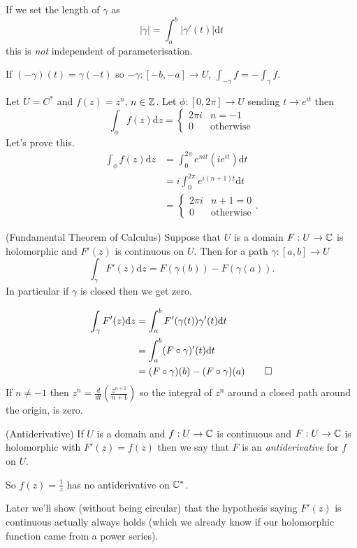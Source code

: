 \documentclass{article}
\begin{document}
\begin{remark}
  If we set the length of $ \gamma $ as
  \[
    |\gamma| = \int_a^b |\gamma'(t)|\mathrm dt
  \]
  this is \textit{not} independent of parameterisation.
\end{remark}
If $ (-\gamma)(t) = \gamma(-t) $ so $ -\gamma: [-b,-a]\to U $, $ \int_{-\gamma} f = -\int_\gamma f $.
\par
Let $ U=C^* $ and $ f(z) = z^n $, $ n\in \mathbb{Z} $. Let $ \phi:[0,2\pi]\to U $ sending $ t\to e^{it} $ then
\[
  \int_\phi f(z)\mathrm dz = \begin{cases}
     2\pi i & n = -1 \\
     0 & \text{otherwise}
  \end{cases}
\]
Let's prove this.
\begin{align*}
	\int_\phi f(z)\mathrm dz &= \int_0^{2\pi} e^{nit}(ie^{it})\mathrm dt \\
				 &= i\int_0^{2\pi} e^{i(n+1)t} \mathrm dt\\
				 &= \begin{cases}
					 2\pi i & n+1 = 0\\
					 0 & \text{otherwise}
				 \end{cases}.
\end{align*}
\begin{theorem}
	(Fundamental Theorem of Calculus) Suppose that $ U $ is a domain $ F:U\to \mathbb{C} $ is holomorphic and $ F'(z) $ is continuous on $ U $. Then for a path $ \gamma:[a,b]\to U $
	\[
	  \int_\gamma F'(z)\mathrm dz = F(\gamma(b)) - F(\gamma(a)).
	\]
	In particular if $ \gamma $ is closed then we get zero.
\end{theorem}
\pf 
\begin{align*}
	\int_\gamma F'(z)\mathrm dz &= \int_a^b F'(\gamma(t))\gamma'(t)\mathrm dt \\
				    &= \int_a^b (F\circ \gamma)'(t)\mathrm dt\\
				    &= (F\circ \gamma)(b) - (F\circ\gamma)(a)\qed
\end{align*}
If $ n\ne -1 $ then $ z^n =\frac {d}{dt}\left(\frac{z^{n+1}}{n+1}\right) $ so the integral of $ z^n $ around a closed path around the origin, is zero.
\begin{definition}
	(Antiderivative) If $ U $ is a domain and $ f:U\to \mathbb{C} $ is continuous and $ F:U\to \mathbb{C} $ is holomorphic with $ F'(z)=f(z) $ then we say that $ F $ is an \textit{antiderivative} for $ f $ on $ U $.
\end{definition}
So $ f(z) = \frac 1z $ has no antiderivative on $ \mathbb{C}^* $.
\begin{remark}
  Later we'll show (without being circular) that the hypothesis saying $ F'(z) $ is continuous actually always holds (which we already know if our holomorphic function came from a power series).
\end{remark}
\end{document}
